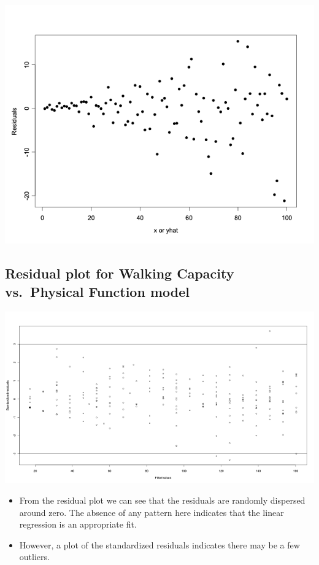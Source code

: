 \documentclass[
]{book}
\providecommand{\tightlist}{%
  \setlength{\itemsep}{0pt}\setlength{\parskip}{0pt}}
\begin{document}
\includegraphics[width=1\linewidth]{./12_44}

\hypertarget{residual-plot-for-walking-capacity-vs.-physical-function-model}{%
\subsection{Residual plot for Walking Capacity vs.~Physical Function model}\label{residual-plot-for-walking-capacity-vs.-physical-function-model}}

\includegraphics[width=1\linewidth]{./12_45}

\begin{itemize}
\tightlist
\item
  From the residual plot we can see that the residuals are randomly dispersed around zero. The absence of any pattern here indicates that the linear regression is an appropriate fit.
\item
  However, a plot of the standardized residuals indicates there may be a few outliers.
\end{itemize}
\end{document}
